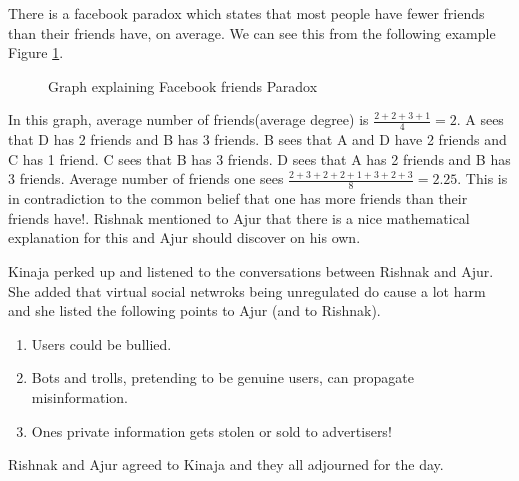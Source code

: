  There is a facebook paradox which states that most people have fewer friends than their friends have, on average. We can see this from the following example Figure \ref{21g1}.
 \begin{figure}
\begin{center}
\caption{ Graph explaining Facebook friends Paradox}\label{21g1}
\end{center}
\end{figure}

In this graph, average number of friends(average degree) is $\frac{2+2+3+1}{4}=2$.  A sees that D has 2 friends and B has 3 friends. B sees that A and D have 2 friends and C has 1 friend. C sees that B has 3 friends. D sees that A has 2 friends and B has 3 friends. Average number of friends one sees 
$\frac{2+3+2+2+1+3+2+3}{8}=2.25$. This is in contradiction to the common belief that one has more friends than their friends have!. Rishnak mentioned to Ajur that there is a nice mathematical explanation for this and Ajur should discover on his own.

Kinaja perked up and listened to the conversations between Rishnak and Ajur. She added that virtual social netwroks being unregulated do cause a lot harm and she listed the following points to Ajur (and to Rishnak).
\begin{enumerate}
    \item Users could be bullied.
    \item  Bots and trolls, pretending to be genuine users,  can propagate misinformation.
    \item  Ones private information gets stolen or sold to advertisers!
\end{enumerate}

Rishnak and Ajur agreed to Kinaja and they all adjourned for the day.